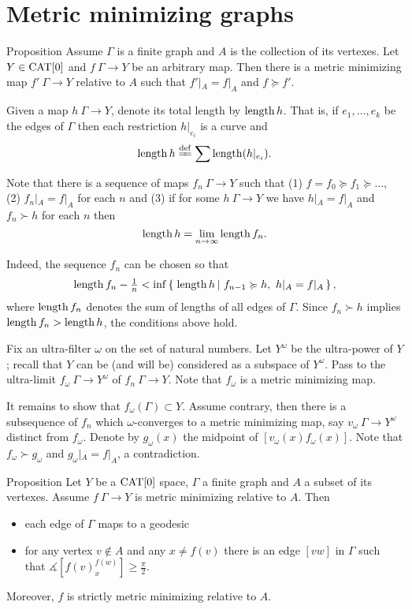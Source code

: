 \documentclass[a4paper,10pt]{amsart}
\begin{document}
\section{Metric minimizing graphs}



\begin{thm}{Proposition}
Assume $\Gamma$ is a  finite graph and $A$ is the collection of its vertexes.
Let $Y\in\mathop{\rm CAT}\nolimits[0]$ and $f\:\Gamma\to Y$ be an arbitrary map.
Then there is a metric minimizing map $f'\:\Gamma\to Y$ relative to $A$ such that
$f'|_A=f|_A$ and 
$f\succcurlyeq f'$.
\end{thm} 

Given a map $h\:\Gamma\to Y$, denote its total length by $\mathop{\rm length}\nolimits h$.
That is, if $e_1,\dots,e_k$ be the edges of $\Gamma$ 
then each restriction $h|_{e_i}$ is a curve and
\[\length h
\df
\sum\length(h|_{e_i}).\]

Note that there is a sequence of maps $f_n\:\Gamma\to Y$
such that (1)
$f=f_0\succcurlyeq f_1\succcurlyeq\dots$, (2) $f_n|_A=f|_A$ for each $n$ and (3) if for some $h\:\Gamma\to Y$ we have $h|_A=f|_A$ and $f_n\succ h$ for each $n$ then 
\[\mathop{\rm length}\nolimits h=\lim_{n\to\infty}\mathop{\rm length}\nolimits f_n.\]

Indeed, the sequence $f_n$ can be chosen so that
\[\length f_n-\tfrac1n
<
\inf\set{\length h}{f_{n-1}\succcurlyeq h,\ h|_A=f|_A},\]
where $\mathop{\rm length}\nolimits f_n$ denotes the sum of lengths of all edges of $\Gamma$. %
Since $f_n\succ h$ implies $\mathop{\rm length}\nolimits f_n>\mathop{\rm length}\nolimits h$, 
the conditions above hold.

Fix an ultra-filter $\omega$ on the set of natural numbers.
Let $Y^\omega$ be the ultra-power of $Y$;
recall that $Y$ can be (and will be) considered as a subspace of $Y^\omega$.
Pass to the ultra-limit $f_\omega\:\Gamma\to Y^\omega$ 
of $f_n\:\Gamma\to Y$.
Note that $f_\omega$ is a metric minimizing map.

It remains to show that $f_\omega(\Gamma)\subset Y$.
Assume contrary, then there is a subsequence of $f_n$ which $\omega$-converges to a metric minimizing map, say $v_\omega\:\Gamma\to Y^\omega$ distinct from $f_\omega$.
Denote by $g_\omega(x)$ the midpoint of $[v_\omega(x)f_\omega(x)]$.
Note that $f_\omega\succ g_\omega$ and $g_\omega|_A=f|_A$, a contradiction.
\qeds

\begin{thm}{Proposition}\label{prop:metric-min-graph}
Let $Y$ be a $\mathop{\rm CAT}\nolimits[0]$ space, 
$\Gamma$ a finite  graph and $A$ a subset of its vertexes.
Assume $f\:\Gamma\to Y$ is metric minimizing relative to $A$.
Then
\begin{itemize}
\item each edge of $\Gamma$ maps to a geodesic
\item for any vertex $v\notin A$ and any $x\ne f(v)$
there is an edge  $[vw]$ in $\Gamma$ such that
$\measuredangle[f(v)^{f(w)}_x]\ge \tfrac\pi2$.
\end{itemize}
Moreover, $f$ is strictly metric minimizing relative to $A$. 
\end{thm}
\end{document}
